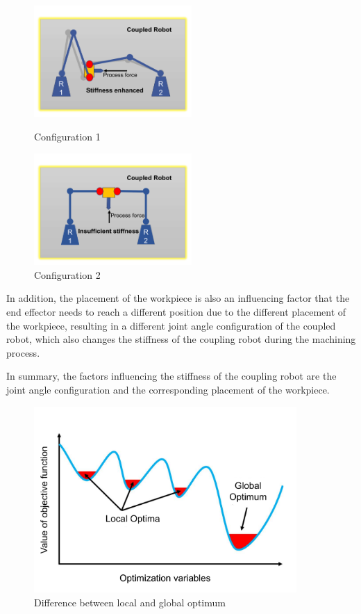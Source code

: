 \begin{figure}[h!]
\centering
\begin{minipage}[t]{0.48\textwidth}
\centering
\includegraphics[width=6cm]{03_images/co_stiff_1.pdf}
\caption{Configuration 1}
\label{fig:Introduction:configuration1}
\end{minipage}
\begin{minipage}[t]{0.48\textwidth}
\centering
\includegraphics[width=6cm]{03_images/co_stiff_2.pdf}
\caption{Configuration 2}
\label{fig:Introduction:configuration2}
\end{minipage}
\end{figure}
In addition, the placement of the workpiece is also an influencing factor that the end effector needs to reach a different position due to the different placement of the workpiece, resulting in a different joint angle configuration of the coupled robot, which also changes the stiffness of the coupling robot during the machining process.\par
In summary, the factors influencing the stiffness of the coupling robot are the joint angle configuration and the corresponding placement of the workpiece.\par
\begin{figure}[ht!]
	\centering
	\includegraphics[width=10cm]{03_images/local_global.pdf}
	\caption{Difference between local and global optimum}
	\label{fig:Introduction:local_global}
\end{figure}
